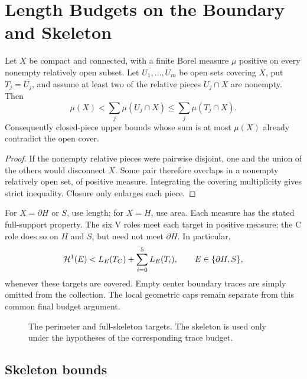 \section{Length Budgets on the Boundary and Skeleton}
\label{sec:trace-length}
\label{sec:length}
\label{app:trace-length-optimization}




\begin{lemma}
\label{lem:open-cover-budget}
Let $X$ be compact and connected, with a finite Borel measure $\mu$
positive on every nonempty relatively open subset. Let $U_1,\ldots,U_m$
be open sets covering $X$, put $T_j=\overline{U_j}$, and assume at least
two of the relative pieces $U_j\cap X$ are nonempty. Then
\[
 \mu(X)<\sum_j\mu(U_j\cap X)\le\sum_j\mu(T_j\cap X).
\]
Consequently closed-piece upper bounds whose sum is at most $\mu(X)$
already contradict the open cover.
\end{lemma}
\begin{proof}
If the nonempty relative pieces were pairwise disjoint, one and the union
of the others would disconnect $X$. Some pair therefore overlaps in a
nonempty relatively open set, of positive measure. Integrating the covering
multiplicity gives strict inequality. Closure only enlarges each piece.
\end{proof}

For $X=\partial H$ or $S$, use length; for $X=H$, use area. Each measure
has the stated full-support property. The six V roles meet each target
in positive measure; the C role does so on $H$ and $S$, but need not meet
$\partial H$. In particular,
\begin{equation}
 \mathcal H^1(E)<L_E(T_C)+\sum_{i=0}^5L_E(T_i),\qquad E\in\{\partial H,S\},
 \label{eq:length-subadditivity}
\end{equation}
whenever these targets are covered. Empty center boundary traces are simply
omitted from the collection. The local geometric caps remain separate from
this common final budget argument.

\begin{figure}[H]
\centering

\caption{The perimeter and full-skeleton targets.  The skeleton is used only
under the hypotheses of the corresponding trace budget.}
\label{fig:strategy1-targets}
\end{figure}

\subsection{Skeleton bounds}

